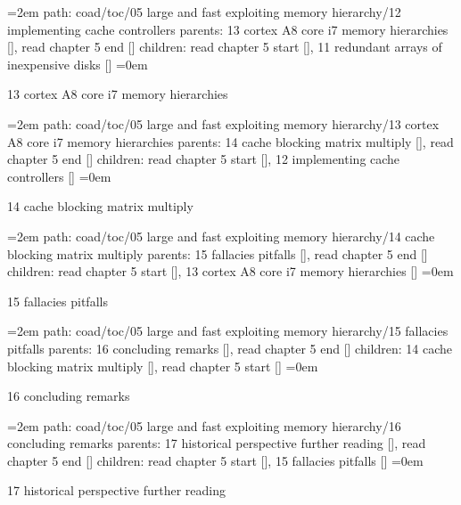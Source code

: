 \smallskip
\par\begingroup
\leftskip=2em
path: coad/toc/05 large and fast exploiting memory hierarchy/12 implementing cache controllers
\smallskip
parents:  13 cortex A8 core i7 memory hierarchies [], read chapter 5 end []
\smallskip
children: read chapter 5 start [], 11 redundant arrays of inexpensive disks []
\smallskip
\leftskip=0em
\par\endgroup
\bigskip
{}
13 cortex A8 core i7 memory hierarchies
\smallskip
\par\begingroup
\leftskip=2em
path: coad/toc/05 large and fast exploiting memory hierarchy/13 cortex A8 core i7 memory hierarchies
\smallskip
parents:  14 cache blocking matrix multiply [], read chapter 5 end []
\smallskip
children: read chapter 5 start [], 12 implementing cache controllers []
\smallskip
\leftskip=0em
\par\endgroup
\bigskip
{}
14 cache blocking matrix multiply
\smallskip
\par\begingroup
\leftskip=2em
path: coad/toc/05 large and fast exploiting memory hierarchy/14 cache blocking matrix multiply
\smallskip
parents:  15 fallacies pitfalls [], read chapter 5 end []
\smallskip
children: read chapter 5 start [], 13 cortex A8 core i7 memory hierarchies []
\smallskip
\leftskip=0em
\par\endgroup
\bigskip
{}
15 fallacies pitfalls
\smallskip
\par\begingroup
\leftskip=2em
path: coad/toc/05 large and fast exploiting memory hierarchy/15 fallacies pitfalls
\smallskip
parents:  16 concluding remarks [], read chapter 5 end []
\smallskip
children: 14 cache blocking matrix multiply [], read chapter 5 start []
\smallskip
\leftskip=0em
\par\endgroup
\bigskip
{}
16 concluding remarks
\smallskip
\par\begingroup
\leftskip=2em
path: coad/toc/05 large and fast exploiting memory hierarchy/16 concluding remarks
\smallskip
parents:  17 historical perspective further reading [], read chapter 5 end []
\smallskip
children: read chapter 5 start [], 15 fallacies pitfalls []
\smallskip
\leftskip=0em
\par\endgroup
\bigskip
{}
17 historical perspective further reading
\smallskip
\par\begingroup
